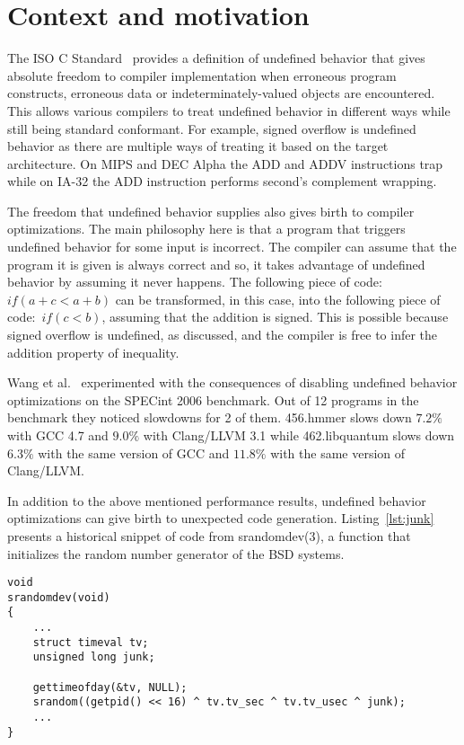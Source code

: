 \section{Context and motivation}

The ISO C Standard~\cite{iso90} provides a definition of undefined
behavior that gives absolute freedom to compiler implementation when
erroneous program constructs, erroneous data or indeterminately-valued
objects are encountered. This allows various compilers to treat
undefined behavior in different ways while still being standard
conformant. For example, signed overflow is undefined behavior as there
are multiple ways of treating it based on the target architecture. On
MIPS and DEC Alpha the ADD and ADDV instructions trap while on IA-32 the
ADD instruction performs second's complement wrapping.

The freedom that undefined behavior supplies also gives birth to
compiler optimizations. The main philosophy here is that a program that
triggers undefined behavior for some input is incorrect. The compiler
can assume that the program it is given is always correct and so, it
takes advantage of undefined behavior by assuming it never happens. The
following piece of code:~\textit{\(if (a + c < a + b)\)} can be
transformed, in this case, into the following piece of
code:~\textit{\(if (c < b)\)}, assuming that the addition is signed.
This is possible because signed overflow is undefined, as discussed, and
the compiler is free to infer the addition property of inequality.

Wang et al.~\cite{wang2012undefined} experimented with the consequences
of disabling undefined behavior optimizations on the SPECint 2006
benchmark. Out of 12 programs in the benchmark they noticed slowdowns
for 2 of them. 456.hmmer slows down $7.2\%$ with GCC 4.7 and $9.0\%$
with Clang/LLVM 3.1 while 462.libquantum slows down $6.3\%$ with the
same version of GCC and $11.8\%$ with the same version of Clang/LLVM.

In addition to the above mentioned performance results, undefined
behavior optimizations can give birth to unexpected code generation.
Listing~\ref{lst:junk} presents a historical snippet of code from
srandomdev(3), a function that initializes the random number generator
of the BSD systems.

\begin{lstlisting}[style=Cstyle, caption={srandom function in
lib/libc/stdlib/random.c on BSD systems}, label={lst:junk}]
void
srandomdev(void)
{
	...
	struct timeval tv;
	unsigned long junk;

	gettimeofday(&tv, NULL);
	srandom((getpid() << 16) ^ tv.tv_sec ^ tv.tv_usec ^ junk);
	...
}
\end{lstlisting}

